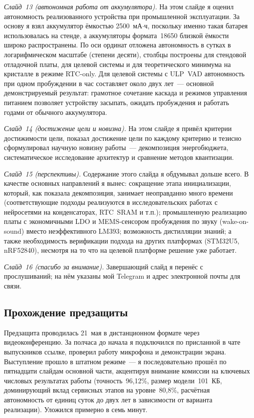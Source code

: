 \textit{Слайд~13 (автономная работа от аккумулятора).} На этом слайде я
оценил автономность реализованного устройства при промышленной
эксплуатации. За основу я взял аккумулятор ёмкостью 2500~мА$\cdot$ч,
поскольку именно такая батарея использовалась на стенде, а аккумуляторы
формата~18650 близкой ёмкости широко распространены. По оси ординат
отложена автономность в сутках в логарифмическом масштабе (степени
десяти), столбцы построены для стендовой отладочной платы, для целевой
системы и для теоретического минимума на кристалле в режиме RTC-only.
Для целевой системы с ULP~VAD автономность при одном пробуждении в час
составляет около двух лет~--- основной демонстрируемый результат:
грамотное сочетание каскада и режимов управления питанием позволяет
устройству засыпать, ожидать пробуждения и работать годами от обычного
аккумулятора.

\textit{Слайд~14 (достижение цели и новизна).} На этом слайде я привёл
критерии достижимости цели, показал достижение цели по каждому критерию
и тезисно сформулировал научную новизну работы~--- декомпозиция
энергобюджета, систематическое исследование архитектур и сравнение
методов квантизации.

\textit{Слайд~15 (перспективы).} Содержание этого слайда я обдумывал
дольше всего. В качестве основных направлений я вынес: сокращение этапа
инициализации, который, как показала декомпозиция, занимает
неоправданно много времени (соответствующие подходы реализуются в
исследовательских работах с нейросетями на конденсаторах, RTC~SRAM и
т.п.); промышленную реализацию платы с экономичными LDO и MEMS-сенсором
пробуждения по звуку (wake-on-sound) вместо неэффективного LM393;
возможность дистилляции знаний; а также необходимость верификации
подхода на других платформах (STM32U5, nRF52840), несмотря на то что на
целевой платформе решение уже работает.

\textit{Слайд~16 (спасибо за внимание).} Завершающий слайд я перенёс с
прослушиваний; на нём указаны мой Telegram и адрес электронной почты для
связи.

\subsection{Прохождение предзащиты}

Предзащита проводилась 21~мая в дистанционном формате через
видеоконференцию. За полчаса до начала я подключился по
присланной в чате выпускников ссылке, проверил работу
микрофона и демонстрации экрана. Выступление прошло в штатном
режиме~--- я последовательно прошёл по пятнадцати слайдам
основной части, акцентируя внимание комиссии на ключевых
числовых результатах работы (точность~96,12\%, размер
модели~101~КБ, доминирующий вклад сервисных этапов на
уровне~80,8\%, расчётная автономность от единиц суток до
двух лет в зависимости от варианта реализации). Уложился
примерно в семь минут.

